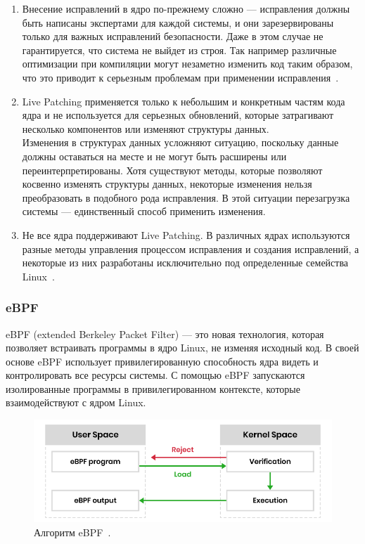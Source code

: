 \begin{enumerate}
    \item Внесение исправлений в ядро по-прежнему сложно — исправления должны быть написаны экспертами для каждой системы,
    и они зарезервированы только для важных исправлений безопасности.
    Даже в этом случае не гарантируется, что система не выйдет из строя.
    Так например различные оптимизации при компиляции могут незаметно изменить код таким образом, что это приводит к серьезным проблемам при применении исправления~\cite{livepatch-problems}.
    \item Live Patching применяется только к небольшим и конкретным частям кода ядра и не используется для серьезных обновлений,
    которые затрагивают несколько компонентов или изменяют структуры данных.
    \vspace{0.5cm}\\
    Изменения в структурах данных усложняют ситуацию, поскольку данные должны оставаться на месте и не могут быть расширены или переинтерпретированы.
    Хотя существуют методы, которые позволяют косвенно изменять структуры данных, некоторые изменения нельзя преобразовать в подобного рода исправления.
    В этой ситуации перезагрузка системы — единственный способ применить изменения.
    \item Не все ядра поддерживают Live Patching.
    В различных ядрах используются разные методы управления процессом исправления и создания исправлений,
    а некоторые из них разработаны исключительно под определенные семейства Linux~\cite{infosec}.
\end{enumerate}

\subsubsection{eBPF}\label{subsec:ebpf}

eBPF (extended Berkeley Packet Filter) --- это новая технология, которая позволяет встраивать программы в ядро Linux, не изменяя исходный код.
В своей основе eBPF использует привилегированную способность ядра видеть и контролировать все ресурсы системы.
С помощью eBPF запускаются изолированные программы в привилегированном контексте, которые взаимодействуют с ядром Linux.

\begin{figure}[H]
    \centering
    \includegraphics[width=\textwidth]{inc/img/eBPF_work}
    \caption{Алгоритм eBPF~\cite{ebpf-pic}.}
    \label{fig:eBPF_work}
\end{figure}

